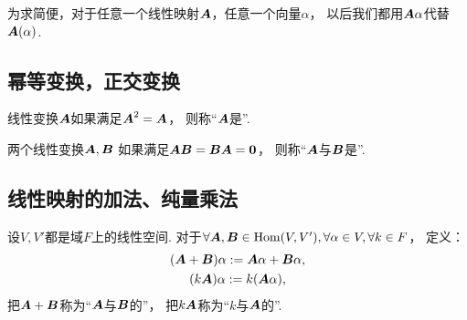 为求简便，对于任意一个线性映射\(\boldsymbol{A}\)，任意一个向量\(\alpha\)，
以后我们都用\(\boldsymbol{A}\alpha\)代替\(\boldsymbol{A}(\alpha)\).

\subsection{幂等变换，正交变换}
\begin{definition}
线性变换\(\boldsymbol{A}\)如果满足\(\boldsymbol{A}^2=\boldsymbol{A}\)，
则称“\(\boldsymbol{A}\)是”.
\end{definition}

\begin{definition}
两个线性变换\(\boldsymbol{A},\boldsymbol{B}\)
如果满足\(\boldsymbol{A} \boldsymbol{B}=\boldsymbol{B} \boldsymbol{A}=\boldsymbol0\)，
则称“\(\boldsymbol{A}\)与\(\boldsymbol{B}\)是”.
\end{definition}

\subsection{线性映射的加法、纯量乘法}
\begin{definition}
设\(V,V'\)都是域\(F\)上的线性空间.
对于\(\forall\boldsymbol{A},\boldsymbol{B}\in\operatorname{Hom}(V,V'),
\forall\alpha\in V,
\forall k\in F\)，
定义：\begin{gather*}
	(\boldsymbol{A}+\boldsymbol{B})\alpha
	:=
	\boldsymbol{A}\alpha+\boldsymbol{B}\alpha, \\
	(k\boldsymbol{A})\alpha
	:=
	k(\boldsymbol{A}\alpha),
\end{gather*}
把\(\boldsymbol{A}+\boldsymbol{B}\)称为“\(\boldsymbol{A}\)与\(\boldsymbol{B}\)的”，
把\(k\boldsymbol{A}\)称为“\(k\)与\(\boldsymbol{A}\)的”.
\end{definition}


